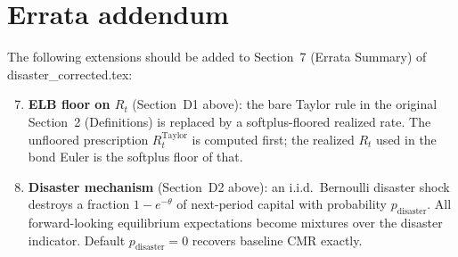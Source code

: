 \section*{Errata addendum}

The following extensions should be added to Section~7 (Errata Summary)
of disaster\_corrected.tex:

\begin{enumerate}
\setcounter{enumi}{6}
\item \textbf{ELB floor on $R_t$} (Section~D1 above): the bare Taylor
  rule in the original Section~2 (Definitions) is replaced by a
  softplus-floored realized rate. The unfloored prescription
  $R^{\text{Taylor}}_t$ is computed first; the realized $R_t$ used in
  the bond Euler is the softplus floor of that.
\item \textbf{Disaster mechanism} (Section~D2 above): an i.i.d.\
  Bernoulli disaster shock destroys a fraction $1 - e^{-\theta}$ of
  next-period capital with probability $p_{\text{disaster}}$. All
  forward-looking equilibrium expectations become mixtures over the
  disaster indicator. Default $p_{\text{disaster}} = 0$ recovers
  baseline CMR exactly.
\end{enumerate}
